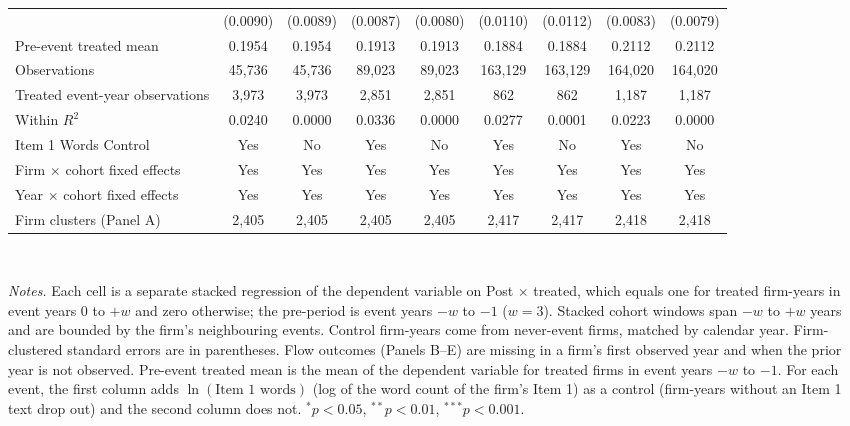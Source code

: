 \begin{landscape}
\begin{table}[H]
\begin{adjustbox}{max width=\linewidth, max totalheight=0.62\textheight}
\begin{tabular}{lcccccccc}
 & (0.0090) & (0.0089) & (0.0087) & (0.0080) & (0.0110) & (0.0112) & (0.0083) & (0.0079) \\
Pre-event treated mean & 0.1954 & 0.1954 & 0.1913 & 0.1913 & 0.1884 & 0.1884 & 0.2112 & 0.2112 \\
Observations & 45,736 & 45,736 & 89,023 & 89,023 & 163,129 & 163,129 & 164,020 & 164,020 \\
Treated event-year observations & 3,973 & 3,973 & 2,851 & 2,851 & 862 & 862 & 1,187 & 1,187 \\
Within $R^2$ & 0.0240 & 0.0000 & 0.0336 & 0.0000 & 0.0277 & 0.0001 & 0.0223 & 0.0000 \\
\midrule
Item 1 Words Control & Yes & No & Yes & No & Yes & No & Yes & No \\
Firm $\times$ cohort fixed effects & Yes & Yes & Yes & Yes & Yes & Yes & Yes & Yes \\
Year $\times$ cohort fixed effects & Yes & Yes & Yes & Yes & Yes & Yes & Yes & Yes \\
Firm clusters (Panel A) & 2,405 & 2,405 & 2,405 & 2,405 & 2,417 & 2,417 & 2,418 & 2,418 \\
\bottomrule
\end{tabular}
\end{adjustbox}
\\[4pt]
\begin{minipage}{\linewidth}\footnotesize
\textit{Notes.} Each cell is a separate stacked regression of the dependent variable on Post $\times$ treated, which equals one for treated firm-years in event years $0$ to $+w$ and zero otherwise; the pre-period is event years $-w$ to $-1$ ($w=3$). Stacked cohort windows span $-w$ to $+w$ years and are bounded by the firm's neighbouring events. Control firm-years come from never-event firms, matched by calendar year. Firm-clustered standard errors are in parentheses. Flow outcomes (Panels B--E) are missing in a firm's first observed year and when the prior year is not observed. Pre-event treated mean is the mean of the dependent variable for treated firms in event years $-w$ to $-1$. For each event, the first column adds $\ln(\text{Item 1 words})$ (log of the word count of the firm's Item 1) as a control (firm-years without an Item 1 text drop out) and the second column does not. $^{*}p<0.05$, $^{**}p<0.01$, $^{***}p<0.001$.
\end{minipage}
\end{table}
\end{landscape}
